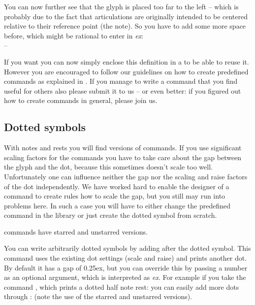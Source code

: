 \documentclass{article}
\begin{document}
You can now further see that the glyph is placed too far to the left -- which is probably due to the fact that articulations are originally intended to be centered relative to their reference point (the note).
So you have to add some more space before, which might be rational to enter in \emph{ex}:\\
 -- \hspace{1ex}

\medskip
If you want you can now simply enclose this definition in a   to be able to reuse it.
However you are encouraged to follow our guidelines on how to create predefined commands as explained in .
If you manage to write a command that you find useful for others also please submit it to us -- or even better: if you figured out how to create commands in general, please join us.

\subsection{Dotted symbols}
\label{subsec:dotted_symbols}
With notes and rests you will find  versions of commands.
If you use significant scaling factors for the commands you have to take care about the gap between the glyph and the dot, because this sometimes doesn't scale too well.
Unfortunately one can influence neither the gap nor the scaling and raise factors of the dot independently.
We have worked hard to enable the designer of a command to create rules how to scale the gap, but you still may run into problems here. 
In such a case you will have to either change the predefined command in the library or just create the dotted symbol from scratch.

 commands have starred and unstarred versions.

You can write arbitrarily dotted symbols by adding  after the dotted symbol. 
This command uses the existing dot settings (scale and raise) and prints another dot. 
By default it has a gap of 0.25ex, but you can override this by passing a number as an optional argument, which is interpreted as \emph{ex}.
For example if you take the command , which prints a dotted half note rest: \halfNoteRestDotted  you can easily add more dots through : \halfNoteRestDotted*\lilyPrintMoreDots (note the use of the starred and unstarred versions).
\end{document}
